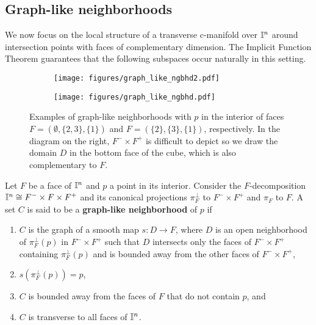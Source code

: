 \subsection{Graph-like neighborhoods}

We now focus on the local structure of a transverse c-manifold over $\mathbb{I}^n$ around intersection points with faces of complementary dimension.
The Implicit Function Theorem guarantees that the following subspaces occur naturally in this setting.

\begin{figure}[!h]
	\centering
	\begin{subfigure}{.32\textwidth}
		\texttt{[image: figures/graph\_like\_ngbhd2.pdf]}
		\hfill
	\end{subfigure}
	\begin{subfigure}{.32\textwidth}
		\hfill
		\texttt{[image: figures/graph\_like\_ngbhd.pdf]}
	\end{subfigure}
	\caption{Examples of graph-like neighborhoods with $p$ in the interior of faces $F=(\emptyset, \{2,3\}, \{1\})$ and $F=(\{2\}, \{3\}, \{1\})$, respectively. In the diagram on the right, $F^-\times F^+$ is difficult to depict so we draw the domain $D$ in the bottom face of the cube, which is also complementary to $F$. }
	\label{F: graph like neighborhood}
\end{figure}

\begin{definition} \label{D: graph-like}
	Let $F$ be a face of $\mathbb{I}^n$ and $p$ a point in its interior.
	Consider the $F$-decomposition $\mathbb{I}^n \cong F^- \times F \times F^+$ and its canonical projections $\pi_F^{\perp}$ to $F^- \times F^+$ and $\pi_F$ to $F$.
	A set $C$ is said to be a \textbf{graph-like neighborhood} of $p$ if 
	\begin{enumerate}
		\item $C$ is the graph of a smooth map $s: D \to F$, where $D$ is an open neighborhood of $\pi_F^\perp(p)$ in $F^- \times F^+$ such that $D$ intersects only the faces of $F^- \times F^+$ containing $\pi_F^\perp(p)$ and is bounded away from the other faces of $F^- \times F^+$,
		
		\item $s(\pi_F^\perp(p)) = p$,
		
		\item $C$ is bounded away from the faces of $F$ that do not contain $p$, and
		
		\item $C$ is transverse to all faces of $\mathbb{I}^n$.
	\end{enumerate}
\end{definition}

